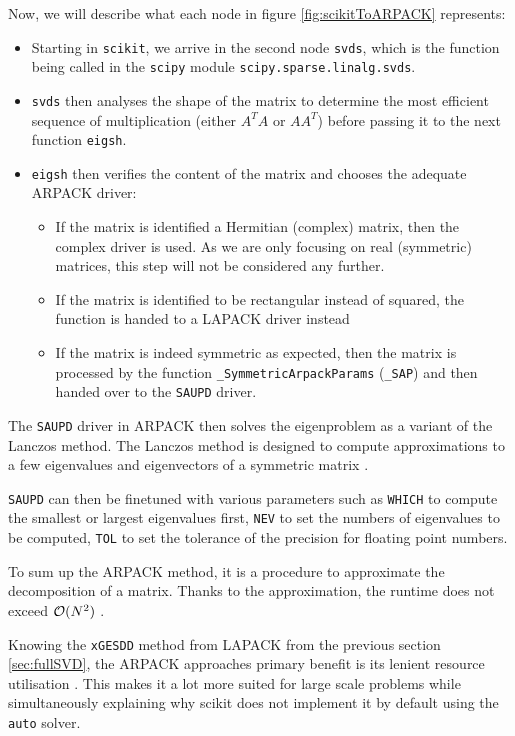 Now, we will describe what each node in figure \ref{fig:scikitToARPACK} represents:
\begin{itemize}
	\item Starting in \texttt{scikit}, we arrive in the second node \texttt{svds}, which is the function being called in the \texttt{scipy} module \texttt{scipy.sparse.linalg.svds}.
	\item \texttt{svds} then analyses the shape of the matrix to determine the most efficient sequence of multiplication (either $A^TA$ or $AA^T$) before passing it to the next function \texttt{eigsh}.
	\item \texttt{eigsh} then verifies the content of the matrix and chooses the adequate ARPACK driver:
	\begin{itemize}
		\item If the matrix is identified a Hermitian (complex) matrix, then the complex driver is used. As we are only focusing on real (symmetric) matrices, this step will not be considered any further.
		\item If the matrix is identified to be rectangular instead of squared, the function is handed to a LAPACK driver instead
		\item If the matrix is indeed symmetric as expected, then the matrix is processed by the function \texttt{\_SymmetricArpackParams} (\texttt{\_SAP}) and then handed over to the \texttt{SAUPD} driver.
	\end{itemize}
\end{itemize}

The \texttt{SAUPD} driver in ARPACK then solves the eigenproblem as a variant of the Lanczos method.
The Lanczos method is designed to compute approximations to a few eigenvalues and eigenvectors of a symmetric matrix \cite{lehoucq1998arpack}.

\texttt{SAUPD} can then be finetuned with various parameters such as \texttt{WHICH} to compute the smallest or largest eigenvalues first, \texttt{NEV} to set the numbers of eigenvalues to be computed, \texttt{TOL} to set the tolerance of the precision for floating point numbers.
\bigskip

To sum up the ARPACK method, it is a procedure to approximate the decomposition of a matrix.
Thanks to the approximation, the runtime does not exceed $\mathcal{O}(N^2)$ \cite{brunton2019data, wright2001large}.

Knowing the \texttt{xGESDD} method from LAPACK from the previous section \ref{sec:fullSVD}, the ARPACK approaches primary benefit is its lenient resource utilisation \cite{anderson1999lapack}.
This makes it a lot more suited for large scale problems while simultaneously explaining why \gls{scikit} does not implement it by default using the \texttt{auto} solver.

